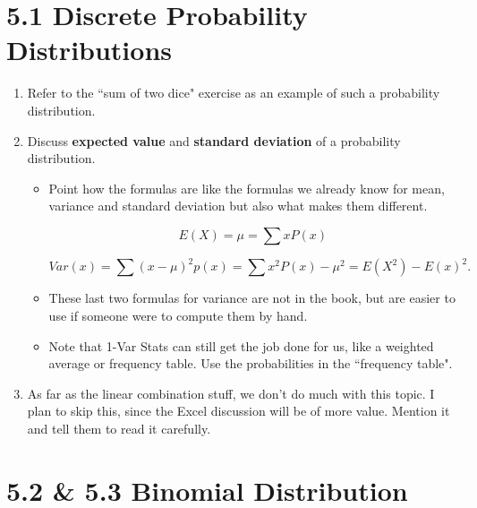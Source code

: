 \documentclass{article}
\begin{document}
\section*{5.1 Discrete Probability Distributions}

\begin{enumerate}

    \item Refer to the ``sum of two dice" exercise as an example of such a probability distribution.
    
    \item Discuss {\bf expected value} and {\bf standard deviation} of a probability distribution. 
    
        \begin{itemize}
        
            \item Point how the formulas are like the formulas we already know for mean, variance and standard deviation but also what makes them different.
            
            $$E(X) = \mu = \sum xP(x)$$
            
            $$Var(x) = \sum (x-\mu)^2p(x) = \sum x^2P(x) - \mu^2 = E(X^2) - E(x)^2.$$
            
            \item These last two formulas for variance are not in the book, but are easier to use if someone were to compute them by hand.
            
            \item Note that 1-Var Stats can still get the job done for us, like a weighted average or frequency table. Use the probabilities in the ``frequency table".
            
        \end{itemize}
        
    \item As far as the linear combination stuff, we don’t do much with this topic. I plan to skip this, since the Excel discussion will be of more value. Mention it and tell them to read it carefully.

\end{enumerate}

\section*{5.2 \& 5.3 Binomial Distribution}
\end{document}
